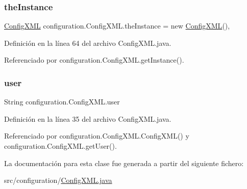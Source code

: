 \subsubsection{\texorpdfstring{theInstance}{theInstance}}
{\footnotesize\ttfamily \mbox{\hyperlink{classconfiguration_1_1_config_x_m_l}{Config\+X\+ML}} configuration.\+Config\+X\+M\+L.\+the\+Instance = new \mbox{\hyperlink{classconfiguration_1_1_config_x_m_l}{Config\+X\+ML}}()\hspace{0.3cm}{\ttfamily [static]}, {\ttfamily [private]}}



Definición en la línea 64 del archivo Config\+X\+M\+L.\+java.



Referenciado por configuration.\+Config\+X\+M\+L.\+get\+Instance().

\mbox{\label{classconfiguration_1_1_config_x_m_l_a79e9a3b8602620dbb873ba491f47164a}} 
\subsubsection{\texorpdfstring{user}{user}}
{\footnotesize\ttfamily String configuration.\+Config\+X\+M\+L.\+user\hspace{0.3cm}{\ttfamily [private]}}



Definición en la línea 35 del archivo Config\+X\+M\+L.\+java.



Referenciado por configuration.\+Config\+X\+M\+L.\+Config\+X\+M\+L() y configuration.\+Config\+X\+M\+L.\+get\+User().



La documentación para esta clase fue generada a partir del siguiente fichero\+:\begin{DoxyCompactItemize}
\item 
src/configuration/\mbox{\hyperlink{_config_x_m_l_8java}{Config\+X\+M\+L.\+java}}\end{DoxyCompactItemize}
